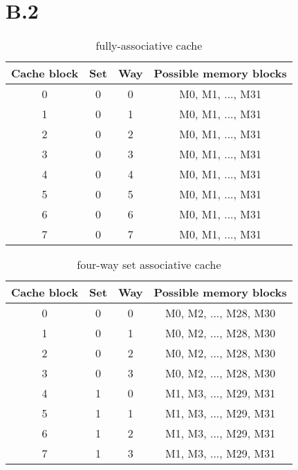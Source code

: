 \documentclass{article}
\begin{document}
\section{B.2}
\begin{table}[h!]
  \begin{center}
    \caption{fully-associative cache}
    \label{tab:table1}
    \begin{tabular}{c|c|c|c} %
      \toprule
      \textbf{Cache block} & \textbf{Set} & \textbf{Way} & \textbf{Possible memory blocks}\\
      \hline
      0 & 0 & 0 & M0, M1, ..., M31\\
      \hline
      1 & 0 & 1 & M0, M1, ..., M31\\
      \hline
      2 & 0 & 2 & M0, M1, ..., M31\\
      \hline
      3 & 0 & 3 & M0, M1, ..., M31\\
      \hline
      4 & 0 & 4 & M0, M1, ..., M31\\
      \hline
      5 & 0 & 5 & M0, M1, ..., M31\\
      \hline
      6 & 0 & 6 & M0, M1, ..., M31\\
      \hline
      7 & 0 & 7 & M0, M1, ..., M31\\
      \bottomrule
    \end{tabular}
  \end{center}
\end{table}
\begin{table}[h!]
  \begin{center}
    \caption{four-way set associative cache}
    \label{tab:table2}
    \begin{tabular}{c|c|c|c} %
      \toprule
      \textbf{Cache block} & \textbf{Set} & \textbf{Way} & \textbf{Possible memory blocks}\\
      \hline
      0 & 0 & 0 & M0, M2, ..., M28, M30\\
      \hline
      1 & 0 & 1 & M0, M2, ..., M28, M30\\
      \hline
      2 & 0 & 2 & M0, M2, ..., M28, M30\\
      \hline
      3 & 0 & 3 & M0, M2, ..., M28, M30\\
      \hline
      4 & 1 & 0 & M1, M3, ..., M29, M31\\
      \hline
      5 & 1 & 1 & M1, M3, ..., M29, M31\\
      \hline
      6 & 1 & 2 & M1, M3, ..., M29, M31\\
      \hline
      7 & 1 & 3 & M1, M3, ..., M29, M31\\
      \bottomrule
    \end{tabular}
  \end{center}
\end{table}
\end{document}
